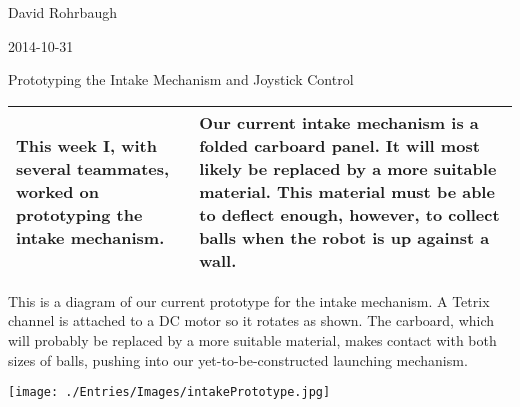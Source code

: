 David Rohrbaugh

2014-10-31

Prototyping the Intake Mechanism and Joystick Control

\begin{tabular}{|p{5cm}|p{5cm}|}
 \hline
 This week I, with several teammates, worked on prototyping the intake mechanism.
 &
 Our current intake mechanism is a folded carboard panel. It will most likely be replaced by a more suitable material. This material must be able to deflect enough, however, to collect balls when the robot is up against a wall.
 \\
 \hline
\end{tabular}

\medskip

This is a diagram of our current prototype for the intake mechanism. A Tetrix channel is attached to a DC motor so it rotates as shown. The carboard, which will probably be replaced by a more suitable material, makes contact with both sizes of balls, pushing into our yet-to-be-constructed launching mechanism.

\begin{center}
 \texttt{[image: ./Entries/Images/intakePrototype.jpg]}
\end{center}

